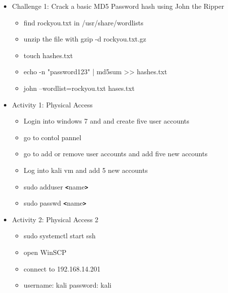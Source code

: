 \documentclass[12pt]{article}
\newcommand{\code}[1]{\texttt{\bfseries#1}}
\begin{document}
\begin{itemize}
	\item Challenge 1: Crack a basic MD5 Password hash using John the Ripper
			\begin{itemize}

            \item find rockyou.txt in /usr/share/wordlists
            \item unzip the file with gzip -d rockyou.txt.gz
            \item touch hashes.txt
			\item echo -n "password123" | md5sum >> hashes.txt
			\item john --wordlist=rockyou.txt hases.txt

		\end{itemize} 
	
	\item Activity 1: Physical Access
		\begin{itemize}
			\item Login into windows 7 and and create five user accounts
			\item go to contol pannel
            \item go to add or remove user accounts and add five new accounts
			\item Log into kali vm and add 5 new accounts
            \item sudo adduser \code<name\code>
            \item sudo passwd \code<name\code>
			
		\end{itemize}
	\item Activity 2: Physical Access 2
		\begin{itemize}
			\item sudo systemctl start ssh
			\item open WinSCP
            \item connect to 192.168.14.201
            \item username: kali password: kali
			

\end{itemize}
\end{itemize}
\end{document}
